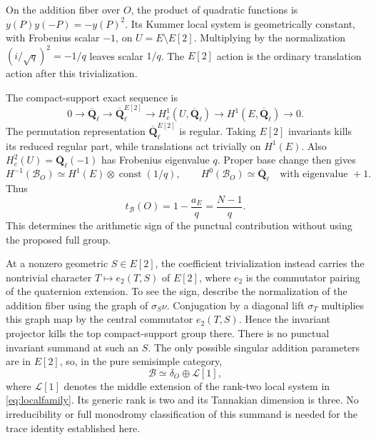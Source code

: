 \documentclass[11pt,a4paper]{article}
\numberwithin{equation}{section}
\newcommand{\Q}{\overline{\mathbf Q}_{\ell}}
\newcommand{\const}{\operatorname{const}}
\newcommand{\B}{\mathcal B}
\begin{document}
On the addition fiber over $O$, the product of quadratic functions is $y(P)y(-P)=-y(P)^2$. Its Kummer local system is geometrically constant, with Frobenius scalar $-1$, on $U=E\setminus E[2]$. Multiplying by the normalization $(i/\sqrt q)^2=-1/q$ leaves scalar $1/q$. The $E[2]$ action is the ordinary translation action after this trivialization.

The compact-support exact sequence is
\begin{equation}\label{eq:openexact}
 0\longrightarrow\Q\longrightarrow\Q^{E[2]}
 \longrightarrow H_c^1(U,\Q)
 \longrightarrow H^1(E,\Q)\longrightarrow0.
\end{equation}
The permutation representation $\Q^{E[2]}$ is regular. Taking $E[2]$ invariants kills its reduced regular part, while translations act trivially on $H^1(E)$. Also $H_c^2(U)=\Q(-1)$ has Frobenius eigenvalue $q$. Proper base change then gives
\begin{equation}\label{eq:originstalk}
 H^{-1}(\B_O)\simeq H^1(E)\otimes\const(1/q),\qquad
 H^0(\B_O)\simeq\Q\quad\text{with eigenvalue }+1.
\end{equation}
Thus
\begin{equation}\label{eq:origintrace}
 \boxed{t_{\B}(O)=1-\frac{a_E}{q}=\frac{N-1}{q}.}
\end{equation}
This determines the arithmetic sign of the punctual contribution without using the proposed full group.

At a nonzero geometric $S\in E[2]$, the coefficient trivialization instead carries the nontrivial character $T\mapsto e_2(T,S)$ of $E[2]$, where $e_2$ is the commutator pairing of the quaternion extension. To see the sign, describe the normalization of the addition fiber using the graph of $\sigma_S\nu$. Conjugation by a diagonal lift $\sigma_T$ multiplies this graph map by the central commutator $e_2(T,S)$. Hence the invariant projector kills the top compact-support group there. There is no punctual invariant summand at such an $S$. The only possible singular addition parameters are in $E[2]$, so, in the pure semisimple category,
\begin{equation}\label{eq:Bdecomp}
 \B\simeq\delta_O\oplus\mathcal L[1],
\end{equation}
where $\mathcal L[1]$ denotes the middle extension of the rank-two local system in \eqref{eq:localfamily}. Its generic rank is two and its Tannakian dimension is three. No irreducibility or full monodromy classification of this summand is needed for the trace identity established here.
\end{document}
